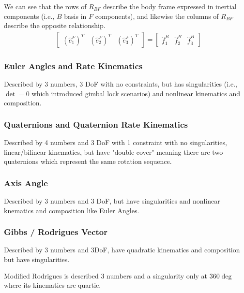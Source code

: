 \documentclass{article}
\begin{document}
We can see that the rows of $R_{BF}$ describe the body frame expressed in inertial components (i.e., $B$ basis in $F$ components), and likewise the columns of $R_{BF}$ describe the opposite relationship.
\begin{align*}
    & \begin{bmatrix} (\hat{e}_1^F)^T & (\hat{e}_2^F)^T & (\hat{e}_3^F)^T\end{bmatrix} = \begin{bmatrix} \hat{f}_1^B & \hat{f}_2^B & \hat{f}_3^B\end{bmatrix}
\end{align*}


\subsubsection{Euler Angles and Rate Kinematics}

Described by 3 numbers, 3 DoF with no constraints, but has singularities (i.e., $\det = 0$ which introduced gimbal lock scenarios) and nonlinear kinematics and composition.

\subsubsection{Quaternions and Quaternion Rate Kinematics}

Described by 4 numbers and 3 DoF with 1 constraint with no singularities, linear/bilinear kinematics, but have "double cover" meaning there are two quaternions which represent the same rotation sequence.

\subsubsection{Axis Angle}

Described by 3 numbers and 3 DoF, but have singularities and nonlinear knematics and composition like Euler Angles.

\subsubsection{Gibbs / Rodrigues Vector}

Described by 3 numbers and 3DoF, have quadratic kinematics and composition but have singularities. 

Modified Rodrigues is described 3 numbers and a singularity only at $360\deg$ where its kinematics are quartic.

\appendix
\end{document}
